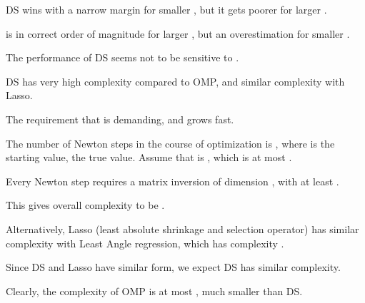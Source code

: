 {
\blank [big]
}
{
\I DS wins with a narrow margin for smaller \m {\s}, but it gets poorer for larger \m {\s}.

\I {} is in correct order of magnitude for larger \m {\s}, but an overestimation for smaller \m {\s}.

\I The performance of DS seems not to be sensitive to .

\I DS has very high complexity compared to OMP, and similar complexity with Lasso.

\I The requirement that  is demanding, and  grows fast.
}
{
\I The number of Newton steps in the course of optimization is , where  is the starting value,  the true value.
Assume that is , which is at most .

\I Every Newton step requires a matrix inversion of dimension , with at least .

\I This gives overall complexity to be .
}
{
\I Alternatively, Lasso (least absolute shrinkage and selection operator) has similar complexity with Least Angle regression, which has complexity .

\I Since DS and Lasso have similar form, we expect DS has similar complexity.

\I Clearly, the complexity of OMP is at most , much smaller than DS.
}


